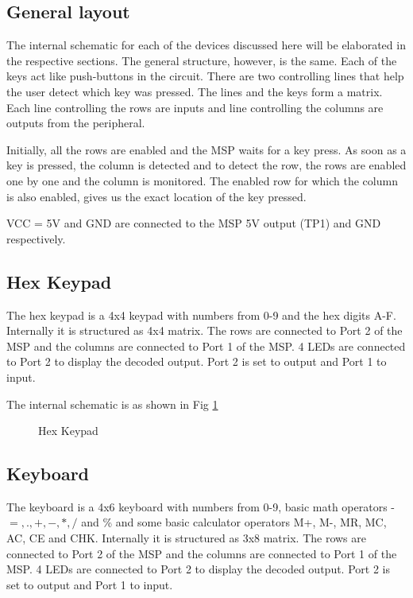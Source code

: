 \documentclass[12pt, letterpaper]{article}
\begin{document}
\subsection{General layout}

The internal schematic for each of the devices discussed here will be elaborated in the respective sections. The general structure, however, is the same. Each of the keys act like push-buttons in the circuit. There are two controlling lines that help the user detect which key was pressed. The lines and the keys form a matrix. Each line controlling the rows are inputs and line controlling the columns are outputs from the peripheral. 

Initially, all the rows are enabled and the MSP waits for a key press. As soon as a key is pressed, the column is detected and to detect the row, the rows are enabled one by one and the column is monitored. The enabled row for which the column is also enabled, gives us the exact location of the key pressed.

VCC = 5V and GND are connected to the MSP 5V output (TP1) and GND respectively.  

\subsection{Hex Keypad}

The hex keypad is a 4x4 keypad with numbers from 0-9 and the hex digits A-F. Internally it is structured as 4x4 matrix. The rows are connected to Port 2 of the MSP and the columns are connected to Port 1 of the MSP. 4 LEDs are connected to Port 2 to display the decoded output. Port 2 is set to output and Port 1 to input. 

The internal schematic is as shown in Fig \ref{fig:keypad}

\begin{figure}[!h]
	\centering
	\caption{Hex Keypad}
	\label{fig:keypad}
\end{figure}

\subsection{Keyboard}

The keyboard is a 4x6 keyboard with numbers from 0-9, basic math operators - $ =, ., +, -, *, / $ and \% and some basic calculator operators M+, M-, MR, MC, AC, CE and CHK. Internally it is structured as 3x8 matrix. The rows are connected to Port 2 of the MSP and the columns are connected to Port 1 of the MSP. 4 LEDs are connected to Port 2 to display the decoded output. Port 2 is set to output and Port 1 to input. 
\end{document}
